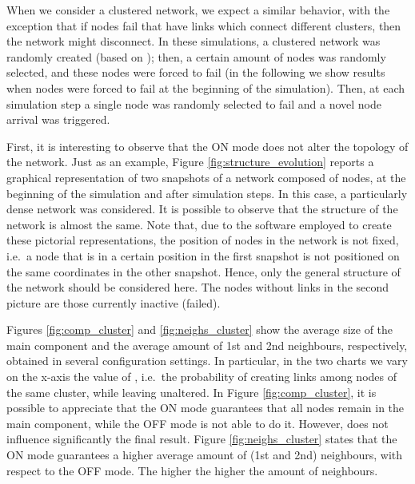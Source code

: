 \documentclass{www13-companion-accepted}
\begin{document}
When we consider a clustered network, we expect a similar behavior, with the exception that if nodes fail that have links which connect different clusters, then the network might disconnect. 
In these simulations, a clustered network was randomly created (based on ); then, a certain amount of nodes was randomly selected, and these nodes were forced to fail (in the following we show results when  nodes were forced to fail at the beginning of the simulation). Then, at each simulation step a single node was randomly selected to fail and a novel node arrival was triggered.

\begin{figure*}[thbp]
   \centering
 \hspace{5mm}
\caption{Two snapshots of the clustered network structure during evolution; node failure rate equal to the node join rate;  nodes,  clusters, ,  (hence on average there are  inter-cluster links)}
   \label{fig:structure_evolution}
\end{figure*}

First, it is interesting to observe that the ON mode does not alter the topology of the network. 
Just as an example, Figure \ref{fig:structure_evolution} reports a graphical representation of two snapshots of a network composed of  nodes, at the beginning of the simulation and after  simulation steps. In this case, a particularly dense network was considered.
It is possible to observe that the structure of the network is almost the same. Note that, due to the software employed to create these pictorial representations, the position of nodes in the network is not fixed, i.e.~a node that is in a certain position in the first snapshot is not positioned on the same coordinates in the other snapshot. Hence, only the general structure of the network should be considered here.
The nodes without links in the second picture are those currently inactive (failed).

Figures \ref{fig:comp_cluster} and \ref{fig:neighs_cluster} show the average size of the main component and the average amount of 1st and 2nd neighbours, respectively, obtained in several configuration settings. In particular, in the two charts we vary on the x-axis the value of , i.e.~the probability of creating links among nodes of the same cluster, while leaving  unaltered. 
In Figure \ref{fig:comp_cluster}, it is possible to appreciate that the ON mode guarantees that all nodes remain in the main component, while the OFF mode is not able to do it. However,  does not influence significantly the final result.
Figure \ref{fig:neighs_cluster} states that the ON mode guarantees a higher average amount of (1st and 2nd) neighbours, with respect to the OFF mode. The higher  the higher the amount of neighbours.
\end{document}
